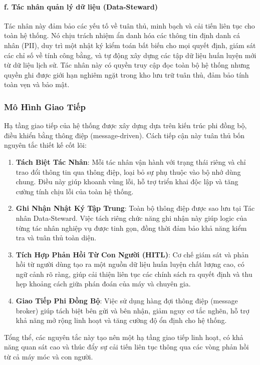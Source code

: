 \documentclass{article}
\begin{document}
\begin{itemize}[topsep=0pt, itemsep=4pt, leftmargin=40pt]
\paragraph{f. Tác nhân quản lý dữ liệu (Data-Steward)}

Tác nhân này đảm bảo các yếu tố về tuân thủ, minh bạch và cải tiến liên tục cho toàn hệ thống. Nó chịu trách nhiệm ẩn danh hóa các thông tin định danh cá nhân (PII), duy trì một nhật ký kiểm toán bất biến cho mọi quyết định, giám sát các chỉ số về tính công bằng, và tự động xây dựng các tập dữ liệu huấn luyện mới từ dữ liệu lịch sử. Tác nhân này có quyền truy cập đọc toàn bộ hệ thống nhưng quyền ghi được giới hạn nghiêm ngặt trong kho lưu trữ tuân thủ, đảm bảo tính toàn vẹn và bảo mật.

\subsubsection{Mô Hình Giao Tiếp}
Hạ tầng giao tiếp của hệ thống được xây dựng dựa trên kiến trúc phi đồng bộ, điều khiển bằng thông điệp (message-driven). Cách tiếp cận này tuân thủ bốn nguyên tắc thiết kế cốt lõi:
\begin{enumerate}[topsep=0pt, itemsep=4pt, leftmargin=40pt, label=\arabic*.]
    \item \textbf{Tách Biệt Tác Nhân}: Mỗi tác nhân vận hành với trạng thái riêng và chỉ trao đổi thông tin qua thông điệp, loại bỏ sự phụ thuộc vào bộ nhớ dùng chung. Điều này giúp khoanh vùng lỗi, hỗ trợ triển khai độc lập và tăng cường tính chịu lỗi của toàn hệ thống.
    \item \textbf{Ghi Nhận Nhật Ký Tập Trung}: Toàn bộ thông điệp được sao lưu tại Tác nhân Data-Steward. Việc tách riêng chức năng ghi nhận này giúp logic của từng tác nhân nghiệp vụ được tinh gọn, đồng thời đảm bảo khả năng kiểm tra và tuân thủ toàn diện.
    \item \textbf{Tích Hợp Phản Hồi Từ Con Người (HITL)}: Cơ chế giám sát và phản hồi từ người dùng tạo ra một nguồn dữ liệu huấn luyện chất lượng cao, có ngữ cảnh rõ ràng, giúp cải thiện liên tục các chính sách ra quyết định và thu hẹp khoảng cách giữa phán đoán của máy và chuyên gia.
    \item \textbf{Giao Tiếp Phi Đồng Bộ}: Việc sử dụng hàng đợi thông điệp (message broker) giúp tách biệt bên gửi và bên nhận, giảm nguy cơ tắc nghẽn, hỗ trợ khả năng mở rộng linh hoạt và tăng cường độ ổn định cho hệ thống.
\end{enumerate}

Tổng thể, các nguyên tắc này tạo nên một hạ tầng giao tiếp linh hoạt, có khả năng quan sát cao và thúc đẩy sự cải tiến liên tục thông qua các vòng phản hồi từ cả máy móc và con người.


\end{itemize}
\end{document}
